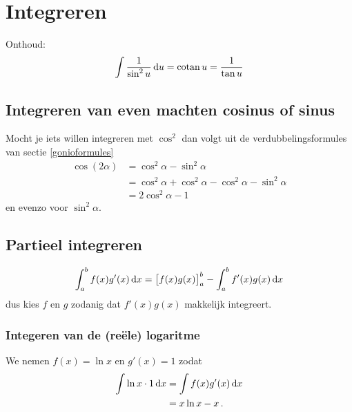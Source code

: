 \documentclass{article}
\begin{document}
	\section{Integreren}
        Onthoud:
        \begin{align*}
            \int \frac{1}{\sin^2 u} \mathop{}\!\mathrm{d} u = \operatorname{\mathop{cotan}} u = \frac{1}{\tan u}
        \end{align*}

		\subsection{Integreren van even machten cosinus of sinus}
		Mocht je iets willen integreren met $\cos^2$ dan volgt uit de verdubbelingsformules van sectie \ref{gonioformules}
 		 \begin{align*}
				  \cos (2\alpha) &= \cos^2 \alpha - \sin^2 \alpha \\
 		 		 &=  \cos^2 \alpha + \cos^2 \alpha - \cos^2 \alpha - \sin^2 \alpha \\
 		 		 &= 2\cos^2 \alpha -1
 		 	 \end{align*}
 		 	 en evenzo voor $\sin^2 \alpha$.

        \subsection{Partieel integreren}
            \[
                \int_a^b f(x) g'(x) \mathop{}\!\mathrm{d} x = \big[f(x)g(x)\big]_a^b - \int_a^b f'(x) g(x) \mathop{}\!\mathrm{d} x
             \]
             dus kies $f$ en $g$ zodanig dat $f'(x)g(x)$ makkelijk integreert.

             \subsubsection{Integeren van de (re\"ele) logaritme}
				We nemen $f(x)=\ln x$ en $g'(x)=1$ zodat
				\begin{align*}
					\int \ln x \cdot 1 \mathop{}\!\mathrm{d} x &= \int f(x)g'(x) \mathop{}\!\mathrm{d} x \\
					&= x \ln x - x \,.
				\end{align*}
\end{document}
